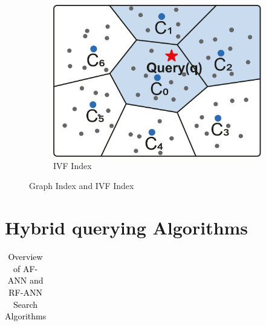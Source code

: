 \documentclass[sigconf, nonacm, pdfa]{acmart}
\begin{document}
{\begin{figure}
\begin{subfigure}{0.38\columnwidth}
			\includegraphics[width=\linewidth]{figures/ivf.pdf}
			\caption{IVF Index}
			\label{fig:ivf}
		\end{subfigure}
		
	\setlength{\abovecaptionskip}{0.15cm}
	\setlength{\belowcaptionskip}{-0.10cm}
		\caption{Graph Index and IVF Index}
		
	\end{figure}
	
	
	\section{Hybrid querying Algorithms}
	
	
	\renewcommand{\arraystretch}{0.9}
	\begin{table}[t]
		\centering
		\setlength{\abovecaptionskip}{0.15cm}
		\setlength{\belowcaptionskip}{-0.1cm}
		
		\caption{\textcolor{black}{Overview of AF-ANN and RF-ANN Search Algorithms}}
		\small
	\label{tab:compair_1}
	\begin{tabular}{|l|l|*{12}{c|}}
		\hline
		

\end{tabular}
\end{table}}
\end{document}
